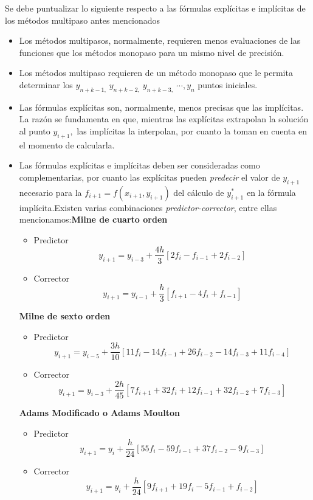 \documentclass[spanish,titlepage,11pt]{article}
\begin{document}
Se debe puntualizar lo siguiente respecto a las f\'{o}rmulas expl\'{i}citas e
impl\'{i}citas de los m\'{e}todos multipaso antes mencionados

\begin{itemize}
\item  Los m\'{e}todos multipasos, normalmente, requieren menos evaluaciones
de las funciones que los m\'{e}todos monopaso para un mismo nivel de
precisi\'{o}n.

\item  Los m\'{e}todos multipaso requieren de un m\'{e}todo monopaso que le
permita determinar los $y_{n+k-1,}\ y_{n+k-2,}\ y_{n+k-3,}\ \cdots,y_{n}$
puntos iniciales.

\item  Las f\'{o}rmulas expl\'{i}citas son, normalmente, menos precisas que
las impl\'{i}citas. La raz\'{o}n se fundamenta en que, mientras las
expl\'{i}citas extrapolan la soluci\'{o}n al punto $y_{i+1},$ las
impl\'{i}citas la interpolan, por cuanto la toman en cuenta en el momento de calcularla.

\item  Las f\'{o}rmulas expl\'{i}citas e impl\'{i}citas deben ser consideradas
como complementarias, por cuanto las expl\'{i}citas pueden \textit{predecir}
el valor de $y_{i+1}$ necesario para la $f_{i+1}=f(x_{i+1},y_{i+1}) $ del
c\'{a}lculo de $y_{i+1}^{*}$ en la f\'{o}rmula impl\'{i}cita.\newline Existen
varias combinaciones \textit{predictor-corrector}, entre ellas
mencionamos:\newline \textbf{Milne de cuarto orden}

\begin{itemize}
\item  Predictor
\[
y_{i+1}=y_{i-3}+\frac{4h}{3}\left[  2f_{i}-f_{i-1}+2f_{i-2}\right]
\]

\item  Corrector
\[
y_{i+1}=y_{i-1}+\frac{h}{3}\left[  f_{i+1}-4f_{i}+f_{i-1}\right]
\]
\end{itemize}

\textbf{Milne de sexto orden}

\begin{itemize}
\item  Predictor
\[
y_{i+1}=y_{i-5}+\frac{3h}{10}\left[  11f_{i}-14f_{i-1}+26f_{i-2}%
-14f_{i-3}+11f_{i-4}\right]
\]

\item  Corrector
\[
y_{i+1}=y_{i-3}+\frac{2h}{45}\left[  7f_{i+1}+32f_{i}+12f_{i-1}+32f_{i-2}%
+7f_{i-3}\right]
\]
\end{itemize}

\textbf{Adams Modificado o Adams Moulton}

\begin{itemize}
\item  Predictor
\[
y_{i+1}=y_{i}+\frac{h}{24}\left[  55f_{i}-59f_{i-1}+37f_{i-2}-9f_{i-3}%
\right]
\]

\item  Corrector
\[
y_{i+1}=y_{i}+\frac{h}{24}\left[  9f_{i+1}+19f_{i}-5f_{i-1}+f_{i-2}\right]
\]
\end{itemize}
\end{itemize}
\end{document}
